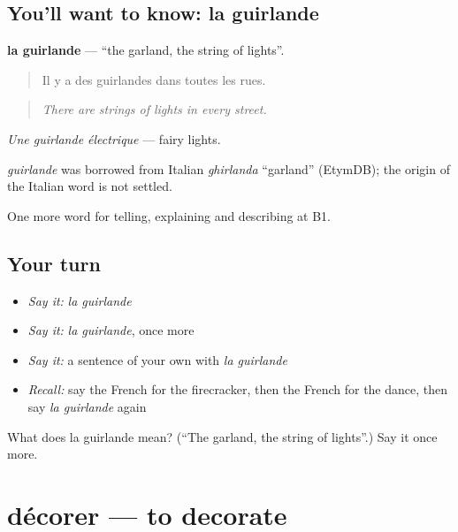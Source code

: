 \subsection*{You'll want to know: la guirlande}
\textbf{la guirlande} — \textquotedblleft{}the garland, the string of lights\textquotedblright{}.

\begin{quote}
Il y a des guirlandes dans toutes les rues.
\end{quote}

\begin{quote}
\emph{There are strings of lights in every street.}
\end{quote}

\emph{Une guirlande électrique} — fairy lights.

\begin{cousinweb}
\emph{guirlande} was borrowed from Italian \emph{ghirlanda} \textquotedblleft{}garland\textquotedblright{} (EtymDB); the origin of the Italian word is not settled.
\end{cousinweb}

\begin{grammarlens}[title={What you've built}]
One more word for telling, explaining and describing at B1.
\end{grammarlens}

\subsection*{Your turn}
\begin{itemize}
\raggedright
  \item \emph{Say it:} \emph{la guirlande}
  \item \emph{Say it:} \emph{la guirlande}, once more
  \item \emph{Say it:} a sentence of your own with \emph{la guirlande}
  \item \emph{Recall:} say the French for the firecracker, then the French for the dance, then say \emph{la guirlande} again
\end{itemize}

\begin{tcolorbox}[breakable,colback=teal!4,colframe=teal!35!black,title={Before you move on}]
What does la guirlande mean? (\textquotedblleft{}The garland, the string of lights\textquotedblright{}.) Say it once more.
\end{tcolorbox}
\section[décorer]{décorer — to decorate}

